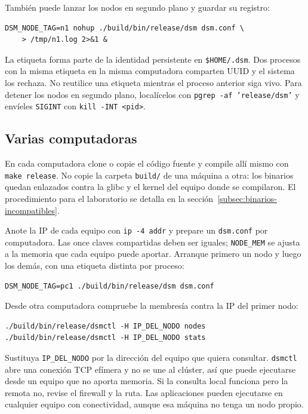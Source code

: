 También puede lanzar los nodos en segundo plano y guardar su registro:

\begin{lstlisting}
DSM_NODE_TAG=n1 nohup ./build/bin/release/dsm dsm.conf \
    > /tmp/n1.log 2>&1 &
\end{lstlisting}

La etiqueta forma parte de la identidad persistente en \texttt{\$HOME/.dsm}. Dos procesos con la misma etiqueta en la misma computadora comparten UUID y el sistema los rechaza. No reutilice una etiqueta mientras el proceso anterior siga vivo. Para detener los nodos en segundo plano, localícelos con \texttt{pgrep -af 'release/dsm'} y envíeles \texttt{SIGINT} con \texttt{kill -INT <pid>}.

\subsection{Varias computadoras}\label{subsec:varias-pc}

En cada computadora clone o copie el código fuente y compile allí mismo con \texttt{make release}. No copie la carpeta \texttt{build/} de una máquina a otra: los binarios quedan enlazados contra la glibc y el kernel del equipo donde se compilaron. El procedimiento para el laboratorio se detalla en la sección~\ref{subsec:binarios-incompatibles}.

Anote la IP de cada equipo con \texttt{ip -4 addr} y prepare un \texttt{dsm.conf} por computadora. Las once claves compartidas deben ser iguales; \texttt{NODE\_MEM} se ajusta a la memoria que cada equipo puede aportar. Arranque primero un nodo y luego los demás, con una etiqueta distinta por proceso:

\begin{lstlisting}
DSM_NODE_TAG=pc1 ./build/bin/release/dsm dsm.conf
\end{lstlisting}

Desde otra computadora compruebe la membresía contra la IP del primer nodo:

\begin{lstlisting}
./build/bin/release/dsmctl -H IP_DEL_NODO nodes
./build/bin/release/dsmctl -H IP_DEL_NODO stats
\end{lstlisting}

Sustituya \texttt{IP\_DEL\_NODO} por la dirección del equipo que quiera consultar. \texttt{dsmctl} abre una conexión TCP efímera y no se une al clúster, así que puede ejecutarse desde un equipo que no aporta memoria. Si la consulta local funciona pero la remota no, revise el firewall y la ruta. Las aplicaciones pueden ejecutarse en cualquier equipo con conectividad, aunque esa máquina no tenga un nodo propio.

